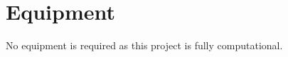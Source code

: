 \documentclass[12pt, class=article, crop=false]{standalone}
\begin{document}
\section*{Equipment}

No equipment is required as this project is fully computational.
\end{document}
